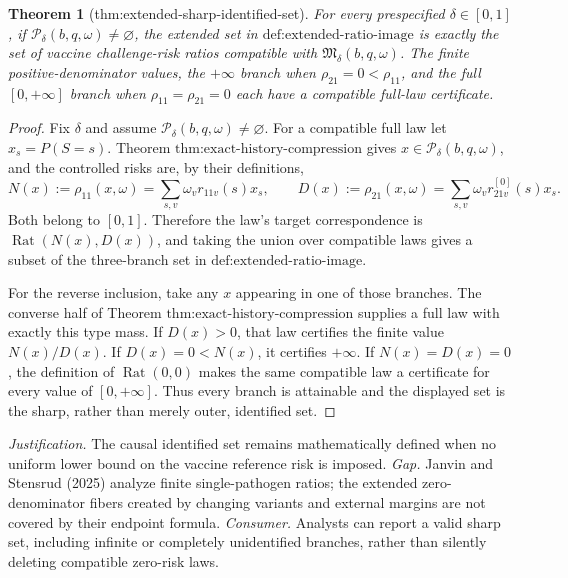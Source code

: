 \documentclass{article}
\newtheorem{theorem}{Theorem}
\begin{document}
\begin{theorem}[thm:extended-sharp-identified-set]\label{thm:extended-sharp-identified-set}
For every prespecified \(\delta\in[0,1]\), if \(\mathcal P_\delta(b,q,\omega)\neq\varnothing\), the extended set in \(\text{def:extended-ratio-image}\) is exactly the set of vaccine challenge-risk ratios compatible with \(\mathfrak M_\delta(b,q,\omega)\). The finite positive-denominator values, the \(+\infty\) branch when \(\rho_{21}=0<\rho_{11}\), and the full \([0,+\infty]\) branch when \(\rho_{11}=\rho_{21}=0\) each have a compatible full-law certificate.
\end{theorem}
\begin{proof}
Fix \(\delta\) and assume \(\mathcal P_\delta(b,q,\omega)\ne\varnothing\).  For a compatible full law let \(x_s=P(S=s)\).  Theorem \(\text{thm:exact-history-compression}\) gives \(x\in\mathcal P_\delta(b,q,\omega)\), and the controlled risks are, by their definitions,
\[
N(x):=\rho_{11}(x,\omega)=\sum_{s,v}\omega_vr_{11v}(s)x_s,
\qquad
D(x):=\rho_{21}(x,\omega)=\sum_{s,v}\omega_vr^{[0]}_{21v}(s)x_s.
\]
Both belong to \([0,1]\).  Therefore the law's target correspondence is \(\operatorname{Rat}(N(x),D(x))\), and taking the union over compatible laws gives a subset of the three-branch set in \(\text{def:extended-ratio-image}\).

For the reverse inclusion, take any \(x\) appearing in one of those branches.  The converse half of Theorem \(\text{thm:exact-history-compression}\) supplies a full law with exactly this type mass.  If \(D(x)>0\), that law certifies the finite value \(N(x)/D(x)\).  If \(D(x)=0<N(x)\), it certifies \(+\infty\).  If \(N(x)=D(x)=0\), the definition of \(\operatorname{Rat}(0,0)\) makes the same compatible law a certificate for every value of \([0,+\infty]\).  Thus every branch is attainable and the displayed set is the sharp, rather than merely outer, identified set.
\end{proof}
\par\smallskip\noindent \textit{Justification.} The causal identified set remains mathematically defined when no uniform lower bound on the vaccine reference risk is imposed. \textit{Gap.} Janvin and Stensrud (2025) analyze finite single-pathogen ratios; the extended zero-denominator fibers created by changing variants and external margins are not covered by their endpoint formula. \textit{Consumer.} Analysts can report a valid sharp set, including infinite or completely unidentified branches, rather than silently deleting compatible zero-risk laws.
\end{document}
